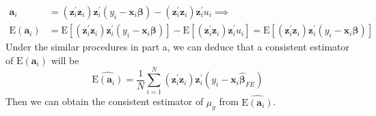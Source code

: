 \begin{enumerate}
\begin{enumerate}
\begin{align*}
            \mathbf{a}_i &= \left( \mathbf{z}_i^\prime \mathbf{z}_i \right) \mathbf{z}_i^\prime(y_i - \mathbf{x}_i\bm{\beta}) - \left( \mathbf{z}_i^\prime \mathbf{z}_i \right) \mathbf{z}_i^\prime u_i \implies \\
            \mathrm{E}(\mathbf{a}_i) &= \mathrm{E}\left[ \left( \mathbf{z}_i^\prime \mathbf{z}_i \right) \mathbf{z}_i^\prime(y_i - \mathbf{x}_i\bm{\beta}) \right] - \mathrm{E} \left[ \left( \mathbf{z}_i^\prime \mathbf{z}_i \right) \mathbf{z}_i^\prime u_i \right] = \mathrm{E}\left[ \left( \mathbf{z}_i^\prime \mathbf{z}_i \right) \mathbf{z}_i^\prime(y_i - \mathbf{x}_i\bm{\beta}) \right]
        \end{align*}
        Under the similar procedures in part a, we can deduce that a consistent estimator of $\mathrm{E}(\mathbf{a}_i)$ will be
        \[ \widehat{\mathrm{E}(\mathbf{a}_i)} = \frac{1}{N} \sum_{i=1}^N \left( \mathbf{z}_i^\prime \mathbf{z}_i \right) \mathbf{z}_i^\prime(y_i - \mathbf{x}_i\hat{\bm{\beta}}_{FE})  \]
        Then we can obtain the consistent estimator of $\mu_g$ from $\widehat{\mathrm{E}(\mathbf{a}_i)}$.
    \end{enumerate}
\end{enumerate}